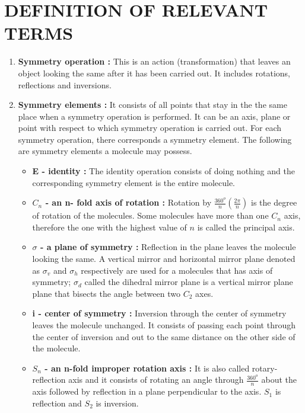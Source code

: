 \documentclass[a4paper, 12pt, openany]{report}
\begin{document}
	\section{DEFINITION OF RELEVANT TERMS}
	\begin{enumerate}
		\item \textbf{Symmetry operation :} This is an action (transformation) that leaves an object looking the same after it has been carried out. It includes rotations, reflections and inversions.
		\item \textbf{Symmetry elements :} It consists of all points that stay in the the same place when a symmetry operation is performed. It can be an axis, plane or point with respect to which symmetry operation is carried out. For each symmetry operation, there corresponds a symmetry element. The following are symmetry elements a molecule may possess.
		\begin{itemize}
			\item \textbf{E - identity :} The identity operation consists of doing nothing and the corresponding symmetry element is the entire molecule.
			\item \textbf{$C_n$ - an n- fold axis of rotation :} Rotation by $\frac{360^o}{n}\left(\frac{2\pi}{n}\right)$ is the degree of rotation of the molecules. Some molecules have more than one $C_n$ axis, therefore the one with the highest value of $n$ is called the principal axis.
			\item \textbf{$\sigma$ - a plane of symmetry :} Reflection in the plane leaves the molecule looking the same. A vertical mirror and horizontal mirror plane \linebreak denoted as $\sigma_v$ and $\sigma_h$ respectively are used for a molecules that has axis of symmetry; $\sigma_d$ called the dihedral mirror plane is a vertical \linebreak mirror plane plane that bisects the angle between two $C_2$ axes.
			\item\textbf{i - center of symmetry :} Inversion through the center of \break symmetry leaves the molecule unchanged. It consists of passing each point through the center of inversion and out to the same distance on the other side of the molecule.
			\item\textbf{$S_n$ - an n-fold improper rotation axis :} It is also called \linebreak rotary-reflection axis and it consists of rotating an angle through $\frac{360^o}{n}$ about the axis followed by reflection in a plane perpendicular to the axis. $S_1$ is reflection and $S_2$ is inversion.

\end{itemize}
\end{enumerate}
\end{document}
